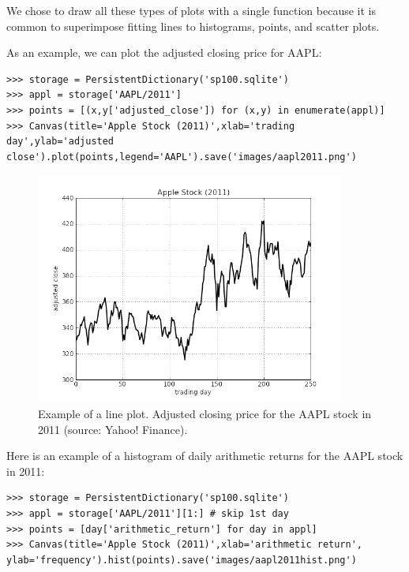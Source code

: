 \documentclass[justified,sixbynine]{tufte-book}
\def\ft{\small\tt}
\theoremstyle{plain}%
\theoremstyle{definition}
\theoremstyle{remark}
\begin{document}
\begin{fullwidth}
We chose to draw all these types of plots with a single function because it is common to superimpose fitting lines to histograms, points, and scatter plots.

As an example, we can plot the adjusted closing price for AAPL:

\begin{lstlisting}[caption={in file: {\ft nlib.py}}]
>>> storage = PersistentDictionary('sp100.sqlite')
>>> appl = storage['AAPL/2011']
>>> points = [(x,y['adjusted_close']) for (x,y) in enumerate(appl)]
>>> Canvas(title='Apple Stock (2011)',xlab='trading day',ylab='adjusted close').plot(points,legend='AAPL').save('images/aapl2011.png')
\end{lstlisting}

\begin{figure}[ht]
\centering\includegraphics[width=4in]{images/aapl2011.png}
\caption{Example of a line plot. Adjusted closing price for the AAPL stock in 2011 (source: Yahoo! Finance).}
\end{figure}

Here is an example of a histogram of daily arithmetic returns for the AAPL stock in 2011:

\begin{lstlisting}[caption={in file: {\ft nlib.py}}]
>>> storage = PersistentDictionary('sp100.sqlite')
>>> appl = storage['AAPL/2011'][1:] # skip 1st day
>>> points = [day['arithmetic_return'] for day in appl]
>>> Canvas(title='Apple Stock (2011)',xlab='arithmetic return', ylab='frequency').hist(points).save('images/aapl2011hist.png')
\end{lstlisting}


\end{fullwidth}
\end{document}
